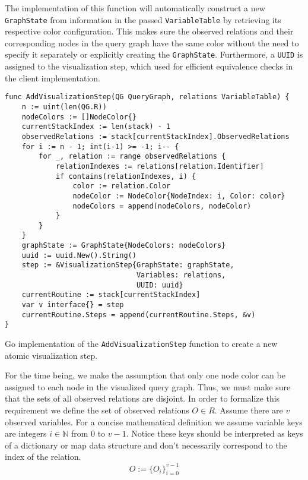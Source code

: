 The implementation of this function will automatically construct a new \texttt{GraphState} from information in the passed \texttt{VariableTable} by retrieving its respective color configuration. This makes sure the observed relations and their corresponding nodes in the query graph have the same color without the need to specify it separately or explicitly creating the \texttt{GraphState}. Furthermore, a \texttt{UUID} is assigned to the visualization step, which used for efficient equivalence checks in the client implementation.

\begin{fullwidth}[width=\textwidth + 0.5cm,leftmargin=-2.5cm]
\begin{algorithm}[H]
\begin{verbatim}
func AddVisualizationStep(QG QueryGraph, relations VariableTable) {
    n := uint(len(QG.R))
    nodeColors := []NodeColor{}
    currentStackIndex := len(stack) - 1
    observedRelations := stack[currentStackIndex].ObservedRelations
    for i := n - 1; int(i-1) >= -1; i-- {
        for _, relation := range observedRelations {
            relationIndexes := relations[relation.Identifier]
            if contains(relationIndexes, i) {
                color := relation.Color
                nodeColor := NodeColor{NodeIndex: i, Color: color}
                nodeColors = append(nodeColors, nodeColor)
            }
        }
    }
    graphState := GraphState{NodeColors: nodeColors}
    uuid := uuid.New().String()
    step := &VisualizationStep{GraphState: graphState, 
                               Variables: relations, 
                               UUID: uuid}
    currentRoutine := stack[currentStackIndex]
    var v interface{} = step
    currentRoutine.Steps = append(currentRoutine.Steps, &v)
}
\end{verbatim}
\caption{Go implementation of the \texttt{AddVisualizationStep} function to create a new atomic visualization step.}
\end{algorithm}
\end{fullwidth}

\begin{note}
For the time being, we make the assumption that only one node color can be assigned to each node in the visualized query graph. Thus, we must make sure that the sets of all observed relations are disjoint. In order to formalize this requirement we define the set of observed relations $O \in R$. Assume there are $v$ observed variables. For a concise mathematical definition we assume variable keys are integers $i \in \mathbb{N}$ from 0 to $v-1$. Notice these keys should be interpreted as keys of a dictionary or map data structure and don't necessarily correspond to the index of the relation.
\begin{equation}
O := \{O_i\}_{i=0}^{v-1}
\end{equation}
\end{note}

